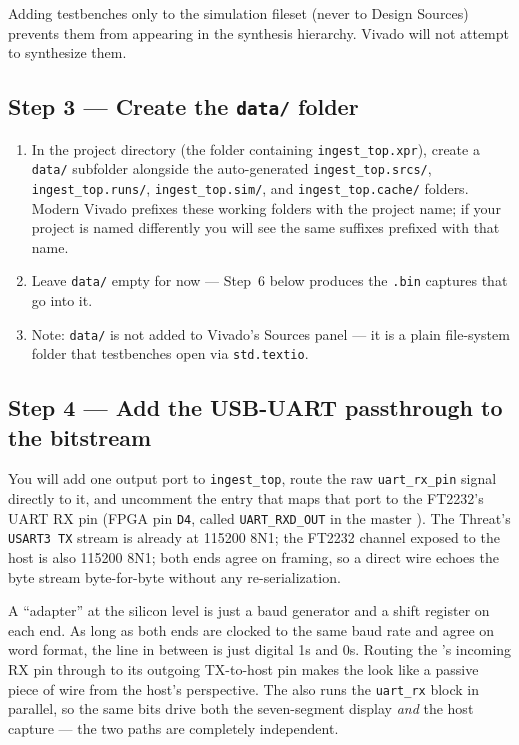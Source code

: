 \documentclass[11pt,letterpaper]{article}
\begin{document}
\begin{tcolorbox}[infobox={Keeping simulation sources isolated}]
	Adding testbenches only to the simulation fileset (never to Design Sources) prevents them from appearing in the synthesis hierarchy. Vivado will not attempt to synthesize them.
\end{tcolorbox}

\subsection{Step 3 --- Create the \texttt{data/} folder}
\begin{enumerate}[leftmargin=2em]
	\item In the project directory (the folder containing \texttt{ingest\_top.xpr}), create a \texttt{data/} subfolder alongside the auto-generated \texttt{ingest\_top.srcs/}, \texttt{ingest\_top.runs/}, \texttt{ingest\_top.sim/}, and \texttt{ingest\_top.cache/} folders. Modern Vivado prefixes these working folders with the project name; if your project is named differently you will see the same suffixes prefixed with that name.
	\item Leave \texttt{data/} empty for now --- Step~6 below produces the \texttt{.bin} captures that go into it.
	\item Note: \texttt{data/} is not added to Vivado's Sources panel --- it is a plain file-system folder that testbenches open via \texttt{std.textio}.
\end{enumerate}

\newpage
\subsection{Step 4 --- Add the USB-UART passthrough to the bitstream}

You will add one output port to \texttt{ingest\_top}, route the raw \texttt{uart\_rx\_pin} signal directly to it, and uncomment the \XDC{} entry that maps that port to the FT2232's UART RX pin (FPGA pin \texttt{D4}, called \texttt{UART\_RXD\_OUT} in the master \XDC{}). The Threat's \texttt{USART3 TX} stream is already at 115200 8N1; the FT2232 channel exposed to the host is also 115200 8N1; both ends agree on framing, so a direct wire echoes the byte stream byte-for-byte without any re-serialization.

\begin{tcolorbox}[infobox={Why a direct wire works}]
	A \UART{} ``adapter'' at the silicon level is just a baud generator and a shift register on each end. As long as both ends are clocked to the same baud rate and agree on word format, the line in between is just digital 1s and 0s. Routing the \FPGA{}'s incoming \mbox{RX} pin through to its outgoing \mbox{TX}-to-host pin makes the \FPGA{} look like a passive piece of wire from the host's perspective. The \FPGA{} also runs the \texttt{uart\_rx} block in parallel, so the same bits drive both the seven-segment display \emph{and} the host capture --- the two paths are completely independent.
\end{tcolorbox}
\end{document}
